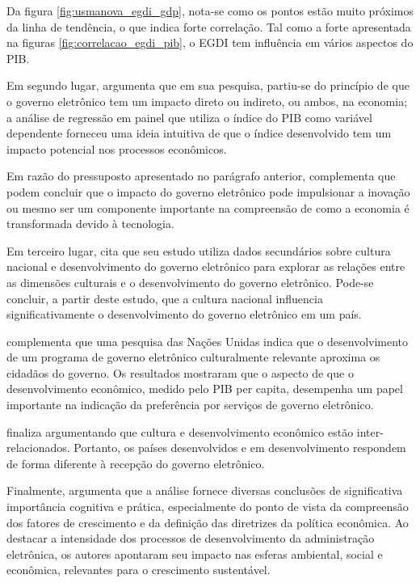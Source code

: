 Da figura \ref{fig:usmanova_egdi_gdp}, nota-se como os pontos estão muito próximos da linha de tendência, o que indica forte correlação. Tal como a forte apresentada na figuras \ref{fig:correlacao_egdi_pib}, o EGDI tem influência em vários aspectos do PIB.

Em segundo lugar, \cite{kotenok2020government} argumenta que em sua pesquisa, partiu-se do princípio de que o governo eletrônico tem um impacto direto ou indireto, ou ambos, na economia; a análise de regressão em painel que utiliza o índice do PIB como variável dependente forneceu uma ideia intuitiva de que o índice desenvolvido tem um impacto potencial nos processos econômicos.

Em razão do pressuposto apresentado no parágrafo anterior, \cite{kotenok2020government} complementa que podem concluir
que o impacto do governo eletrônico pode impulsionar a inovação ou
mesmo ser um componente importante na compreensão de como a
economia é transformada devido à tecnologia.

Em terceiro lugar, \cite{kumar2020cultural} cita que seu estudo utiliza dados secundários sobre cultura nacional e desenvolvimento do governo eletrônico para explorar as relações entre as dimensões culturais e o desenvolvimento do governo eletrônico. Pode-se concluir, a partir deste estudo, que a cultura nacional influencia significativamente o desenvolvimento do governo eletrônico em um país.

\cite{kumar2020cultural} complementa que uma pesquisa das Nações Unidas indica que o desenvolvimento de um programa de governo eletrônico culturalmente relevante aproxima os cidadãos do governo. Os resultados mostraram que o aspecto de que o desenvolvimento econômico, medido pelo PIB per capita, desempenha um papel importante na indicação da preferência por serviços de governo eletrônico.

\cite{kumar2020cultural} finaliza argumentando que cultura e desenvolvimento econômico estão inter-relacionados. Portanto, os países desenvolvidos e em desenvolvimento respondem de forma diferente à recepção do governo eletrônico.

Finalmente, \cite{ziolo2022government} argumenta que a análise fornece diversas conclusões de significativa importância cognitiva e prática, especialmente do ponto de vista da compreensão dos fatores de crescimento e da definição das diretrizes da política econômica. Ao destacar a intensidade dos processos de desenvolvimento da administração eletrônica, os autores apontaram seu impacto nas esferas ambiental, social e econômica, relevantes para o crescimento sustentável.

